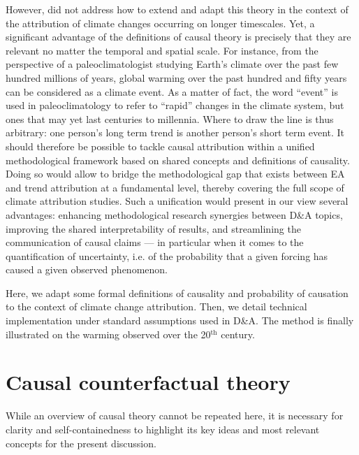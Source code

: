 \documentclass[12pt]{article}
\begin{document}
However, \cite{HPONG15} did not address how to extend and adapt this theory in the context of the attribution of climate changes occurring on longer timescales. Yet, a significant advantage of the definitions of causal theory is precisely that they are relevant no matter the temporal and spatial scale. %
For instance, from the perspective of a paleoclimatologist studying Earth's climate over the past few hundred millions of years, global warming over the past hundred and fifty years can be considered as a climate event. As a matter of fact, the word ``event'' is used in paleoclimatology to refer to ``rapid'' changes in the climate system, but ones that may yet last centuries to millennia. %
Where to draw the line %
is thus arbitrary: one person's long term trend is another person's short term event. It should therefore be possible to tackle causal attribution within a unified methodological framework based on shared concepts and definitions of causality. Doing so would allow to bridge the methodological gap that exists between EA and trend attribution at a fundamental level, thereby covering the full scope of climate attribution studies. Such a unification would present in our view several advantages: enhancing methodological research synergies between D\&A topics, improving the shared interpretability of results, and streamlining the communication of causal claims --- in particular when it comes to the quantification of uncertainty, i.e. of the probability that a given forcing has caused a given observed phenomenon.

Here, we adapt some formal definitions of causality and probability of causation to the context of climate change attribution. Then, we detail technical implementation under standard assumptions used in D\&A. The method is finally illustrated on the warming observed over the 20$^{\textrm{th}}$ century.

\section{Causal counterfactual theory} 

While an overview of causal theory cannot be repeated here, it is necessary for clarity and self-containedness to highlight its key ideas and most relevant concepts for the present discussion.
\end{document}
